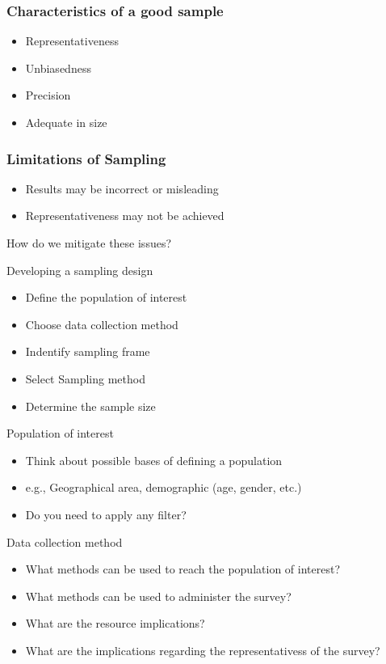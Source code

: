 \documentclass[10pt, compress]{beamer}
\begin{document}
\begin{frame}
    \frametitle{Characteristics of a good sample}
    \begin{itemize}
        \item Representativeness
        \item Unbiasedness
        \item Precision
        \item Adequate in size
    \end{itemize}
\end{frame}

\begin{frame}
    \frametitle{Limitations of Sampling}
    \begin{itemize}
        \item Results may be incorrect or misleading
        \item Representativeness may not be achieved
    \end{itemize}
    \bigskip
    \alert{How do we mitigate these issues?}
\end{frame}

\begin{frame}[t]{Developing a sampling design}
    \begin{itemize}
        \item Define the population of interest
        \item Choose data collection method
        \item Indentify sampling frame
        \item Select Sampling method
        \item Determine the sample size
    \end{itemize}
\end{frame}

\begin{frame}[t]{Population of interest}
    \begin{itemize}
        \item Think about possible bases of defining a population
        \item e.g., Geographical area, demographic (age, gender, etc.)
        \item Do you need to apply any filter?
    \end{itemize}
\end{frame}

\begin{frame}[t]{Data collection method}
    \begin{itemize}
        \item What methods can be used to reach the population of interest?
        \item What methods can be used to administer the survey?
        \item What are the resource implications?
        \item What are the implications regarding the representativess of the survey?
    \end{itemize}
\end{frame}
\end{document}
